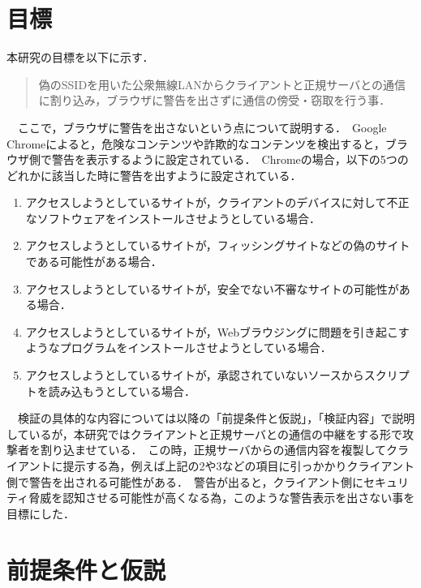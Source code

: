 \documentclass[dvipdfmx]{jsarticle}
\begin{document}
    \section{目標}
        本研究の目標を以下に示す．
        \begin{quote}
            偽のSSIDを用いた公衆無線LANからクライアントと正規サーバとの通信に割り込み，ブラウザに警告を出さずに通信の傍受・窃取を行う事．\
        \end{quote}
        　ここで，ブラウザに警告を出さないという点について説明する．\
        Google Chromeによると，危険なコンテンツや詐欺的なコンテンツを検出すると，ブラウザ側で警告を表示するように設定されている．\
        Chromeの場合，以下の5つのどれかに該当した時に警告を出すように設定されている\cite{GoogleChromeHelp}．\
        \begin{enumerate}
            \item アクセスしようとしているサイトが，クライアントのデバイスに対して不正なソフトウェアをインストールさせようとしている場合．
            \item アクセスしようとしているサイトが，フィッシングサイトなどの偽のサイトである可能性がある場合．
            \item アクセスしようとしているサイトが，安全でない不審なサイトの可能性がある場合．
            \item アクセスしようとしているサイトが，Webブラウジングに問題を引き起こすようなプログラムをインストールさせようとしている場合．
            \item アクセスしようとしているサイトが，承認されていないソースからスクリプトを読み込もうとしている場合．
        \end{enumerate}
        　検証の具体的な内容については以降の「前提条件と仮説」，「検証内容」で説明しているが，本研究ではクライアントと正規サーバとの通信の中継をする形で攻撃者を割り込ませている．\
        この時，正規サーバからの通信内容を複製してクライアントに提示する為，例えば上記の2や3などの項目に引っかかりクライアント側で警告を出される可能性がある．\
        警告が出ると，クライアント側にセキュリティ脅威を認知させる可能性が高くなる為，このような警告表示を出さない事を目標にした．\
    \section{前提条件と仮説}
\end{document}
